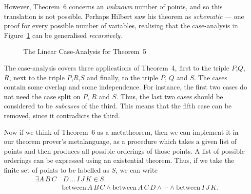 \documentclass{article}
\newcommand{\between}[3]{\text{between}\,#1\,#2\,#3}
\begin{document}
However, Theorem~6 concerns an \emph{unknown} number of points, and so this translation is not possible. Perhaps Hilbert saw his theorem as \emph{schematic} --- one proof for every possible number of variables, realising that the case-analysis in Figure~\ref{fig:Theorem5Cases} can be generalised \emph{recursively}. 

\begin{figure}
\caption{The Linear Case-Analysis for Theorem~5}
\label{fig:Theorem5Cases}
\end{figure}

The case-analysis covers three applications of Theorem~4, first to the triple $P$,$Q$,$R$, next to the triple $P$,$R$,$S$ and finally, to the triple $P$, $Q$ and $S$. The cases contain some overlap and some independence. For instance, the first two cases do not need the case split on $P$, $R$ and $S$. Thus, the last two cases should be considered to be \emph{subcases} of the third. This means that the fifth case can be removed, since it contradicts the third.\label{sec:IgnoreCase5}

Now if we think of Theorem~6 as a metatheorem, then we can implement it in our theorem prover's metalanguage, as a procedure which takes a given list of points and then produces all possible orderings of those points. A list of possible orderings can be expressed using an existential theorem. Thus, if we take the finite set of points to be labelled as $S$, we can write
\begin{align*}\label{theorem:Theorem6Example}
\exists A\,B\,C&\,D\,\ldots\,I\,J\,K \in S.\tag{$\ddagger$}\\
                &\between{A}{B}{C} \wedge \between{A}{C}{D} \wedge \cdots \wedge \between{I}{J}{K}.                 
\end{align*}
\end{document}
